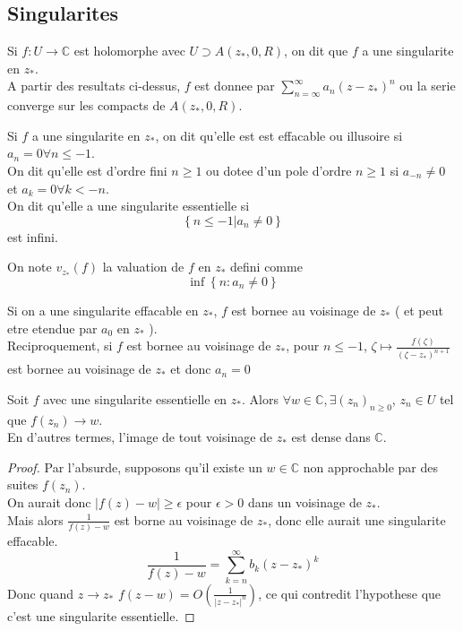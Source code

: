 \documentclass[../main.tex]{subfiles}
\begin{document}
\subsection{Singularites}
Si $f:U\to \mathbb{C}$ est holomorphe avec $U \supset A( z_*, 0, R) $, on dit que $f$ a une singularite en $z_*$.\\
A partir des resultats ci-dessus, $f$ est donnee par $ \sum_{n= \infty }^{ \infty } a_n ( z-z_*)^{n}$ ou la serie converge sur les compacts de $A( z_*,0,R) $.\\
\begin{defn}
	Si $f$ a une singularite en $z_*$, on dit qu'elle est est effacable ou illusoire si $a_n=0 \forall n \leq -1$.\\
	On dit qu'elle est d'ordre fini $n \geq 1$ ou dotee d'un pole d'ordre $n \geq 1$ si $a_{-n } \neq 0$ et $a_k =0 \forall k < -n$.\\
	On dit qu'elle a une singularite essentielle si 
	\[ 
	\left\{ n \leq -1| a_n\neq 0 \right\} 
	\]
	est infini.
\end{defn}
\begin{defn}[Valuation]
	On note $v_{z_*} ( f) $ la valuation de $f$ en $z_*$ defini comme 
	\[ 
	\inf \left\{ n: a_n \neq 0 \right\} 
	\]
	
\end{defn}
\begin{rmq}
Si on a une singularite effacable en $z_*$, $f$ est bornee au voisinage de $z_*$ ( et peut etre etendue par $a_0$ en $z_*$ ).\\
Reciproquement, si $f$ est bornee au voisinage de $z_*$, pour $n \leq -1$, $\zeta\mapsto \frac{f( \zeta) }{( \zeta-z_*) ^{n+1}}$ est bornee au voisinage de $z_*$ et donc $a_n =0$ 
\end{rmq}
\begin{thm}
	Soit $f$ avec une singularite essentielle en $z_*$. Alors $\forall w \in \mathbb{C}, \exists ( z_n)_{n \geq 0} $, $z_n\in U$ tel que $f( z_n) \to w$.\\
	En d'autres termes, l'image de tout voisinage de $z_*$ est dense dans $ \mathbb{C}$.\\
\end{thm}
\begin{proof}
Par l'absurde, supposons qu'il existe un $w\in \mathbb{C}$ non approchable par des suites $f( z_n) $.\\
On aurait donc $ |f( z) -w| \geq \epsilon$ pour $\epsilon>0$ dans un voisinage de $z_*$.\\
Mais alors $ \frac{1}{f( z) -w}$ est borne au voisinage de $ z_*$, donc elle aurait une singularite effacable.\\
\[ 
\frac{1}{f( z) -w} = \sum_{k=n}^{ \infty }b_k ( z-z_*) ^{k}
\]
Donc quand $z\to z_*$ $f( z-w) = O( \frac{1}{|z-z_*|^{n}}) $, ce qui contredit l'hypothese que c'est une singularite essentielle.
\end{proof}
\end{document}
